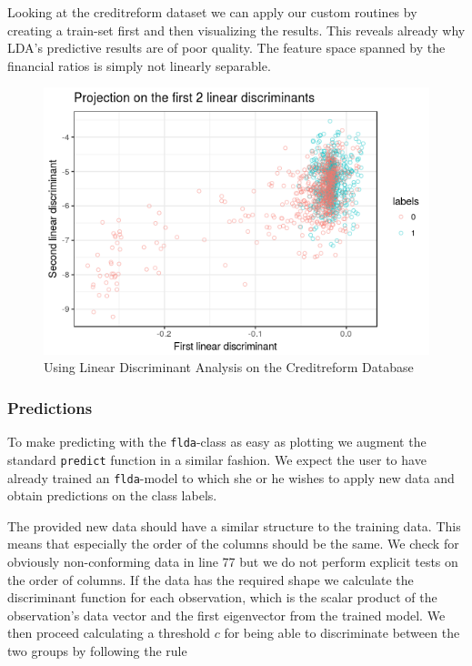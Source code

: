 \documentclass{article}
\begin{document}
Looking at the creditreform dataset we can apply our custom routines by creating a train-set first and then visualizing the results. This reveals already why LDA's predictive results are of poor quality. The feature space spanned by the financial ratios is simply not linearly separable.




\begin{figure}
\caption{Using Linear Discriminant Analysis on the Creditreform Database}
\centering
\includegraphics{../LDA/creditLDA.png}
\end{figure}

\subsubsection{Predictions}

To make predicting with the \texttt{flda}-class as easy as plotting we augment the standard \texttt{predict} function in a similar fashion. We expect the user to have already trained an \texttt{flda}-model to which she or he wishes to apply new data and obtain predictions on the class labels. 

\newpage


The provided new data should have a similar structure to the training data. This means that especially the order of the columns should be the same. We check for obviously non-conforming data in line 77 but we do not perform explicit tests on the order of columns. If the data has the required shape we calculate the discriminant function for each observation, which is the scalar product of the observation's data vector and the first eigenvector from the trained model. We then proceed calculating a threshold $c$ for being able to discriminate between the two groups by following the rule
\end{document}
